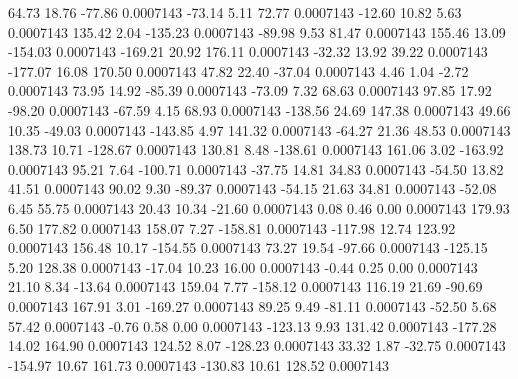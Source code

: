        64.73       18.76      -77.86     0.0007143
      -73.14        5.11       72.77     0.0007143
      -12.60       10.82        5.63     0.0007143
      135.42        2.04     -135.23     0.0007143
      -89.98        9.53       81.47     0.0007143
      155.46       13.09     -154.03     0.0007143
     -169.21       20.92      176.11     0.0007143
      -32.32       13.92       39.22     0.0007143
     -177.07       16.08      170.50     0.0007143
       47.82       22.40      -37.04     0.0007143
        4.46        1.04       -2.72     0.0007143
       73.95       14.92      -85.39     0.0007143
      -73.09        7.32       68.63     0.0007143
       97.85       17.92      -98.20     0.0007143
      -67.59        4.15       68.93     0.0007143
     -138.56       24.69      147.38     0.0007143
       49.66       10.35      -49.03     0.0007143
     -143.85        4.97      141.32     0.0007143
      -64.27       21.36       48.53     0.0007143
      138.73       10.71     -128.67     0.0007143
      130.81        8.48     -138.61     0.0007143
      161.06        3.02     -163.92     0.0007143
       95.21        7.64     -100.71     0.0007143
      -37.75       14.81       34.83     0.0007143
      -54.50       13.82       41.51     0.0007143
       90.02        9.30      -89.37     0.0007143
      -54.15       21.63       34.81     0.0007143
      -52.08        6.45       55.75     0.0007143
       20.43       10.34      -21.60     0.0007143
        0.08        0.46        0.00     0.0007143
      179.93        6.50      177.82     0.0007143
      158.07        7.27     -158.81     0.0007143
     -117.98       12.74      123.92     0.0007143
      156.48       10.17     -154.55     0.0007143
       73.27       19.54      -97.66     0.0007143
     -125.15        5.20      128.38     0.0007143
      -17.04       10.23       16.00     0.0007143
       -0.44        0.25        0.00     0.0007143
       21.10        8.34      -13.64     0.0007143
      159.04        7.77     -158.12     0.0007143
      116.19       21.69      -90.69     0.0007143
      167.91        3.01     -169.27     0.0007143
       89.25        9.49      -81.11     0.0007143
      -52.50        5.68       57.42     0.0007143
       -0.76        0.58        0.00     0.0007143
     -123.13        9.93      131.42     0.0007143
     -177.28       14.02      164.90     0.0007143
      124.52        8.07     -128.23     0.0007143
       33.32        1.87      -32.75     0.0007143
     -154.97       10.67      161.73     0.0007143
     -130.83       10.61      128.52     0.0007143
